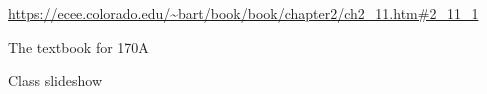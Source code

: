 \item \label{ref:thermal_eq} \url{https://ecee.colorado.edu/~bart/book/book/chapter2/ch2_11.htm#2_11_1}
\item \label{ref:carrier_conc_src} The textbook for 170A
\item \label{ref:slideshow} Class slideshow
